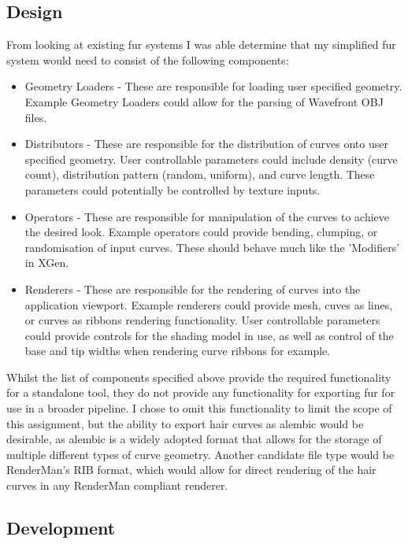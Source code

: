 \documentclass[]{acmsiggraph}
\begin{document}
\subsection{Design} \label{sec:design}
From looking at existing fur systems I was able determine that my simplified fur system would need to consist of the following components:

\begin{itemize}
	\item Geometry Loaders - These are responsible for loading user specified geometry. Example Geometry Loaders could allow for the parsing of Wavefront OBJ files.
	\item Distributors - These are responsible for the distribution of curves onto user specified geometry. User controllable parameters could include density (curve count), distribution pattern (random, uniform), and curve length. These parameters could potentially be controlled by texture inputs.
	\item Operators - These are responsible for manipulation of the curves to achieve the desired look. Example operators could provide bending, clumping, or randomisation of input curves. These should behave much like the 'Modifiers' in XGen.
	\item Renderers - These are responsible for the rendering of curves into the application viewport. Example renderers could provide mesh, cuves as lines, or curves as ribbons rendering functionality. User controllable parameters could provide controls for the shading model in use, as well as control of the base and tip widths when rendering curve ribbons for example.
\end{itemize}

Whilst the list of components specified above provide the required functionality for a standalone tool, they do not provide any functionality for exporting fur for use in a broader pipeline. I chose to omit this functionality to limit the scope of this assignment, but the ability to export hair curves as alembic would be desirable, as alembic is a widely adopted format that allows for the storage of multiple different types of curve geometry. Another candidate file type would be RenderMan's RIB format, which would allow for direct rendering of the hair curves in any RenderMan compliant renderer.

\subsection{Development} \label{sec:development}
\end{document}
